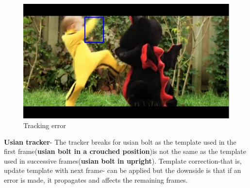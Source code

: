 \documentclass[12pt]{article}
\begin{document}
\begin{figure}[h]
    \centering
    \includegraphics[width=12cm]{trackbaby5}
    \caption{Tracking error}
    \label{fig:Tracking error}
\end{figure}

\textbf{Usian tracker}-
The tracker breaks for usian bolt as the template used in the first frame(\textbf{usian bolt in a crouched position})is not the same as the template used in successive frames(\textbf{usian bolt in upright}). Template correction-that is, update template with next frame- can be applied but the downside is that if an error is made, it propagates and affects the remaining frames.
\end{document}

